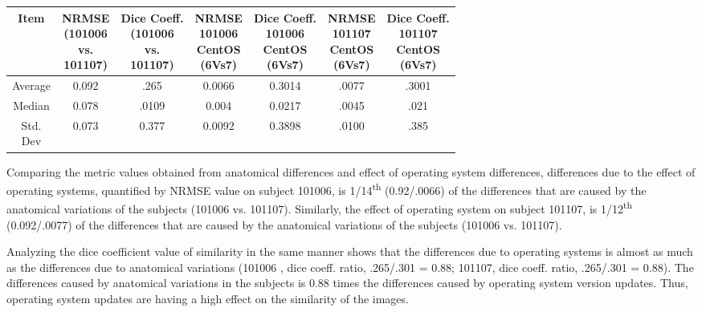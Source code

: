 \begin{center}
\begin{tabularx}{.98\textwidth}{|c|c|c|c|c|c|c|}
\hline
Item  & \makecell[l]{NRMSE\\(101006 \\ vs.\\101107)} & \makecell[l]{Dice Coeff.\\(101006\\ vs.\\101107)} & \makecell[l]{NRMSE\\101006\\CentOS\\(6Vs7)} & \makecell[l]{Dice Coeff.\\ 101006\\CentOS\\(6Vs7)} & \makecell[l]{NRMSE\\101107\\CentOS\\(6Vs7)} & \makecell[l]{Dice Coeff.\\ 101107\\CentOS\\(6Vs7)} \\ \hline
Average            & 0.092        & .265      & 0.0066     & 0.3014   & .0077   & .3001     \\ \hline
Median             & 0.078    & .0109       & 0.004          & 0.0217           & .0045     & .021  \\ \hline
\makecell[l]{Std.\\Dev} & 0.073     & 0.377           & 0.0092         & 0.3898   & .0100       & .385 \\ \hline
\end{tabularx}
\label{tab:comparison_table}
\end{center}

Comparing the metric values obtained from anatomical differences and effect of operating system differences, differences due to the effect of operating systems, quantified by NRMSE value on subject 101006, is 1/14\textsuperscript{th} (0.92/.0066) of the differences that are caused by the anatomical variations of the subjects (101006 vs. 101107). Similarly, the effect of operating system on subject 101107, is 1/12\textsuperscript{th} (0.092/.0077) of the differences that are caused by the anatomical variations of the subjects (101006 vs. 101107).

Analyzing the dice coefficient value of similarity in the same manner shows that the differences due to operating systems is almost as much as the differences due to anatomical variations (101006 , dice coeff. ratio, .265/.301 = 0.88; 101107, dice coeff. ratio, .265/.301 = 0.88). The differences caused by anatomical variations in the subjects is 0.88 times the differences caused by operating system version updates. Thus, operating system updates are having a high effect on the similarity of the images. 
